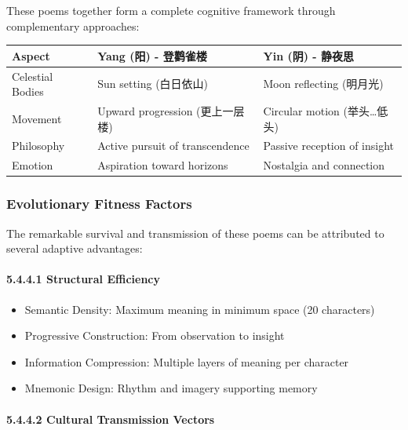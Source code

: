 \documentclass[11pt,letterpaper]{article}
\begin{document}
These poems together form a complete cognitive framework through
complementary approaches:

\begin{longtable}{|p{3cm}|p{5cm}|p{5cm}|}
\hline
\textbf{Aspect} & \textbf{Yang (阳) - 登鹳雀楼} & \textbf{Yin (阴) - 静夜思} \\
\hline
Celestial Bodies & Sun setting (白日依山) & Moon reflecting (明月光) \\
\hline
Movement & Upward progression (更上一层楼) & Circular motion
(举头\ldots 低头) \\
\hline
Philosophy & Active pursuit of transcendence & Passive reception of
insight \\
\hline
Emotion & Aspiration toward horizons & Nostalgia and connection \\
\hline
\end{longtable}

\subsubsection{Evolutionary Fitness Factors}\label{evolutionary-fitness-factors}

The remarkable survival and transmission of these poems can be
attributed to several adaptive advantages:

\paragraph{5.4.4.1 Structural
Efficiency}\label{structural-efficiency}

\begin{itemize}
\tightlist
\item
  Semantic Density: Maximum meaning in minimum space (20 characters)
\item
  Progressive Construction: From observation to insight
\item
  Information Compression: Multiple layers of meaning per character
\item
  Mnemonic Design: Rhythm and imagery supporting memory
\end{itemize}

\paragraph{5.4.4.2 Cultural Transmission
Vectors}\label{cultural-transmission-vectors}
\end{document}
